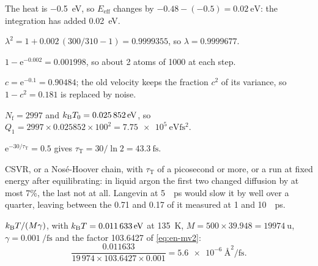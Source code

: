 \label{sec:th-answers}

The heat is \SI{-0.5}{\electronvolt}, so
$E_{\mathrm{eff}}$ changes by $-0.48 - (-0.5) = \SI{+0.02}{\electronvolt}$:
the integration has added \SI{0.02}{\electronvolt}.

$\lambda^2 = 1 + 0.002\,(300/310 - 1) =
0.9999355$, so $\lambda = 0.9999677$.

$1 - \mathrm{e}^{-0.002} = 0.001998$, so about 2
atoms of 1000 at each step.

$c = \mathrm{e}^{-0.1} = 0.90484$; the old
velocity keeps the fraction $c^2$ of its variance, so $1 - c^2 = 0.181$ is
replaced by noise.

$N_{\mathrm f} = 2997$ and $k_{\mathrm{B}} T_0 =
\SI{0.025852}{\electronvolt}$, so $Q_1 = 2997\times0.025852\times100^2 =
\SI{7.75e5}{\electronvolt\femto\second\squared}$.

$\mathrm{e}^{-30/\tau_{\mathrm T}} = 0.5$ gives
$\tau_{\mathrm T} = 30/\ln2 = \SI{43.3}{\femto\second}$.

CSVR, or a Nosé-Hoover chain, with $\tau_{\mathrm
T}$ of a picosecond or more, or a run at fixed energy after equilibrating:
in liquid argon the first two changed diffusion by at most 7\%, the last
not at all. Langevin at \SI{5}{\per\pico\second} would slow it by well
over a quarter, leaving between the 0.71 and 0.17 of it measured at 1 and
\SI{10}{\per\pico\second}.

$k_{\mathrm{B}} T/(M\gamma)$, with $k_{\mathrm{B}} T =
\SI{0.011633}{\electronvolt}$ at \SI{135}{\kelvin}, $M = 500\times39.948 =
\SI{19974}{\amu}$, $\gamma = \SI{0.001}{\per\femto\second}$ and the
factor 103.6427 of \cref{eq:en-mv2}:
\begin{equation*}
   \frac{0.011633}{19\,974\times103.6427\times0.001}
   = \SI{5.6e-6}{\angstrom\squared\per\femto\second} .
\end{equation*}
